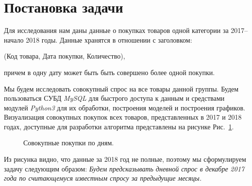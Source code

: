 \section{Постановка задачи}

Для исследования нам даны данные о покупках товаров одной категории за 2017--начало 2018 годы. Данные хранятся в отношении с заголовком:
\begin{center}
        (Код товара, Дата покупки, Количество),
\end{center}
причем в одну дату может быть быть совершено более одной покупки.

Мы будем исследовать совокупный спрос на все товары данной группы. Будем пользоваться СУБД \textit{MySQL} для быстрого доступа к данным и средствами модулей \textit{Python3} для их обработки, построения моделей и построения графиков. Визуализация совокупных покупок всех товаров, представленных в 2017 и 2018 годах, доступные для разработки алгоритма представлены на рисунке Рис.~\ref{img:data}.

\begin{figure}[h]
        \noindent{}
        \caption{Совокупные покупки по дням.}
        \label{img:data}
\end{figure}

Из рисунка видно, что данные за 2018 год не полные, поэтому мы сформулируем задачу следующим образом: 
\textit{Будем предсказывать дневной спрос в декабре 2017 года по считающемуся известным спросу за предыдущие месяцы.}